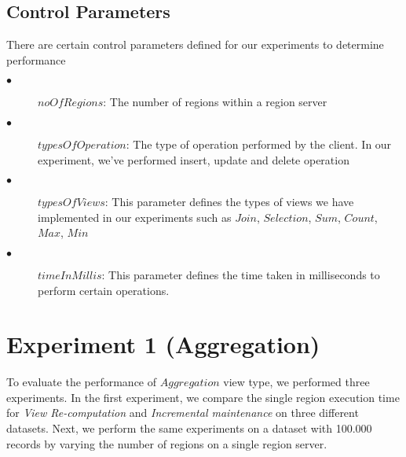 \documentclass[11pt,a4paper,bibtotoc,idxtotoc,headsepline,footsepline,footexclude,BCOR12mm,DIV13]{scrbook}
\begin{document}
\subsection{Control Parameters}
\label{Control Parameter}
There are certain control parameters defined for our experiments to determine performance

\begin{description}
	\item[$\bullet$]  $noOfRegions$: The number of regions within a region server 
\end{description}

\begin{description}
	\item[$\bullet$]  $typesOfOperation$: The type of operation performed by the client. In our experiment, we've performed insert, update and delete operation 
\end{description}

\begin{description}
	\item[$\bullet$]  $typesOfViews$: This parameter defines the types of views we have implemented in our experiments such as $Join$, $Selection$, $Sum$, $Count$, $Max$, $Min$ 
\end{description}

\begin{description}
	\item[$\bullet$]  $timeInMillis$: This parameter defines the time taken in milliseconds to perform certain operations. 
\end{description}

\section{Experiment 1 (Aggregation)}
\label{sec:AggrExp}
To evaluate the performance of $Aggregation$ view type, we performed three experiments. In the first experiment, we compare the single region execution time for \emph{View Re-computation} and \emph{Incremental maintenance} on three different datasets. Next, we perform the same experiments on a dataset with 100.000 records by varying the number of regions on a single region server.
 
\end{document}

